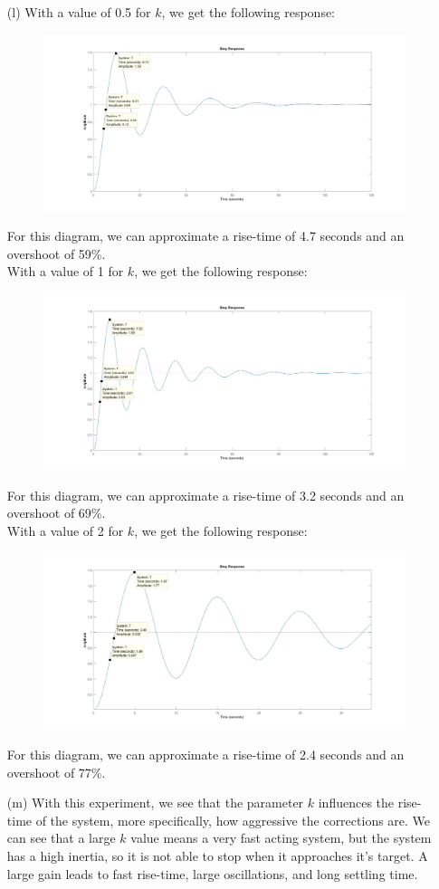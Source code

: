 \documentclass{article}
\begin{document}
\begin{itemize}
    \item[(l)] With a value of 0.5 for $k$, we get the following response:
    \begin{figure}[!htb]
        \centering
        \includegraphics[width=.6\linewidth]{l5.jpg}
    \end{figure}
    For this diagram, we can approximate a rise-time of 4.7 seconds and an overshoot of 59\%.\\
    With a value of 1 for $k$, we get the following response:
    \begin{figure}[!htb]
        \centering
        \includegraphics[width=.6\linewidth]{l1.jpg}
    \end{figure}
    For this diagram, we can approximate a rise-time of 3.2 seconds and an overshoot of 69\%.\\
    With a value of 2 for $k$, we get the following response:
    \begin{figure}[!htb]
        \centering
        \includegraphics[width=.6\linewidth]{l2.jpg}
    \end{figure}
    For this diagram, we can approximate a rise-time of 2.4 seconds and an overshoot of 77\%.\\
    \item[(m)] With this experiment, we see that the parameter $k$ influences the rise-time of the system, more specifically, how aggressive the corrections are. We can see that a large $k$ value means a very fast acting system, but the system has a high inertia, so it is not able to stop when it approaches it's target. A large gain leads to fast rise-time, large oscillations, and long settling time.
\end{itemize}
\end{document}
